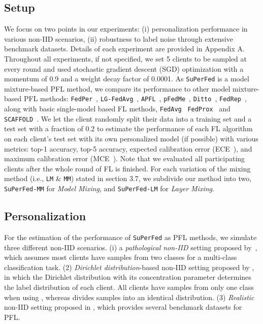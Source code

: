 \documentclass[sigconf]{acmart}
\begin{document}
\subsection{Setup} We focus on two points in our experiments: (i) personalization performance in various non-IID scenarios, (ii) robustness to label noise through extensive benchmark datasets. Details of each experiment are provided in Appendix A. Throughout all experiments, if not specified, we set 5 clients to be sampled at every round and used stochastic gradient descent (SGD) optimization with a momentum of 0.9 and a weight decay factor of 0.0001. 
As \texttt{SuPerFed} is a model mixture-based PFL method, we compare its performance to other model mixture-based PFL methods: \texttt{FedPer}~\cite{FedPer}, \texttt{LG-FedAvg}~\cite{lgfedavg}, \texttt{APFL}~\cite{apfl}, \texttt{pFedMe}~\cite{pfedme}, \texttt{Ditto}~\cite{ditto}, \texttt{FedRep}~\cite{fedrep}, along with basic single-model based FL methods, \texttt{FedAvg}~\cite{mc+17} \texttt{FedProx}~\cite{fedprox} and \texttt{SCAFFOLD}~\cite{ka+19}.
We let the client randomly split their data into a training set and a test set with a fraction of 0.2 to estimate the performance of each FL algorithm on each client's test set with its own personalized model (if possible) with various metrics: top-1 accuracy, top-5 accuracy, expected calibration error (ECE~\cite{ece}), and maximum calibration error (MCE~\cite{mce}). Note that we evaluated all participating clients after the whole round of FL is finished. For each variation of the mixing method (i.e., \texttt{LM} \& \texttt{MM}) stated in section 3.7, we subdivide our method into two, \texttt{SuPerFed-MM} for \textit{Model Mixing}, and \texttt{SuPerFed-LM} for \textit{Layer Mixing}.

\subsection{Personalization} For the estimation of the performance of \texttt{SuPerFed} as PFL methods, we simulate three different non-IID scenarios. (i) a \textit{pathological non-IID} setting proposed by~\cite{mc+17}, which assumes most clients have samples from two classes for a multi-class classification task. (2) \textit{Dirichlet distribution}-based non-IID setting proposed by \cite{diri}, in which the Dirichlet distribution with its concentration parameter  determines the label distribution of each client. All clients have samples from only one class when using , whereas  divides samples into an identical distribution. (3) \textit{Realistic} non-IID setting proposed in \cite{leaf}, which provides several benchmark datasets for PFL.
\end{document}
